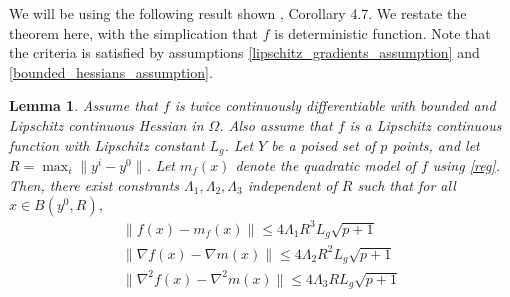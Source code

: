 \documentclass{article}
\newtheorem{lemma}[theorem]{Lemma}
\theoremstyle{case}
\newcommand{\gradf}{\nabla f}
\begin{document}
We will be using the following result shown \cite{Billups_Larson_2013}, Corollary 4.7.
We restate the theorem here, with the simplication that $f$ is deterministic function.
Note that the criteria is satisfied by assumptions \cref{lipschitz_gradients_assumption} and \cref{bounded_hessians_assumption}.

\begin{lemma}
\label{change_radius} 
Assume that $f$ is twice continuously differentiable with bounded and Lipschitz continuous Hessian in $\Omega$.
Also assume that $f$ is a Lipschitz continuous function with Lipschitz constant $L_g$.
Let $Y$ be a poised set of $p$ points, and let $R = \max_{i}\|y^i - y^0\|$.
Let $m_f(x)$ denote the quadratic model of $f$ using \cref{reg}.
Then, there exist constrants $\Lambda_1, \Lambda_2, \Lambda_3$ independent of $R$ such that for all $x \in B(y^0, R)$,
\begin{align*}
\|f(x) - m_f(x)\| \le 4\Lambda_1 R^3L_g \sqrt{p+1} \\
\|\gradf(x) - \nabla m(x)\| \le 4\Lambda_2R^2  L_g \sqrt{p+1} \\
\|\nabla^2 f(x) - \nabla^2 m(x)\| \le 4\Lambda_3  RL_g \sqrt{p+1}
\end{align*}
\end{lemma}
\end{document}
